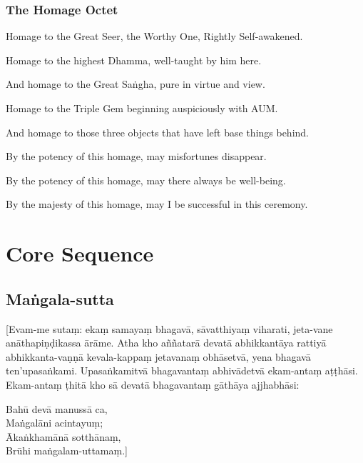 \subsubsection{The Homage Octet}

Homage to the Great Seer, the Worthy One, Rightly Self-awakened.

Homage to the highest Dhamma, well-taught by him here.

And homage to the Great Saṅgha, pure in virtue and view.

Homage to the Triple Gem beginning auspiciously with AUM.

And homage to those three objects that have left base things behind.

By the potency of this homage, may misfortunes disappear.

By the potency of this homage, may there always be well-being.

By the majesty of this homage, may I be successful in this ceremony.

\section{Core Sequence}

\subsection{Maṅgala-sutta}
\label{asevana}

[Evam-me sutaṃ: ekaṃ samayaṃ bhagavā, sāvatthiyaṃ viharati, jeta-vane
anāthapiṇḍikassa ārāme. Atha kho aññatarā devatā abhikkantāya rattiyā
abhikkanta-vaṇṇā kevala-kappaṃ jetavanaṃ obhāsetvā, yena bhagavā ten'upasaṅkami.
Upasaṅkamitvā bhagavantaṃ abhivādetvā ekam-antaṃ aṭṭhāsi. Ekam-antaṃ ṭhitā kho
sā devatā bhagavantaṃ gāthāya ajjhabhāsi:

Bahū devā manussā ca,\\
Maṅgalāni acintayuṃ;\\
Ākaṅkhamānā sotthānaṃ,\\
Brūhi maṅgalam-uttamaṃ.]

\bigskip



